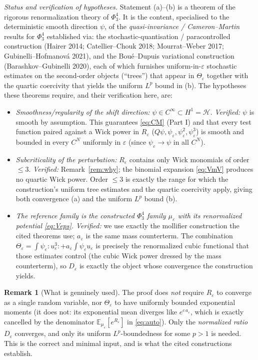 \documentclass[12pt]{article}
\newcommand{\bE}{\mathbb{E}}
\newcommand{\Wick}[1]{{:}#1{:}}
\newcommand{\eps}{\varepsilon}
\theoremstyle{plain}
\theoremstyle{definition}
\newtheorem{remark}{Remark}
\begin{document}
\noindent\emph{Status and verification of hypotheses.} Statement
(a)--(b) is a theorem of the rigorous renormalization theory of $\Phi^4_3$. It is the
content, specialised to the deterministic smooth direction $\psi$, of the
\emph{quasi-invariance / Cameron--Martin} results for $\Phi^4_3$ established via:
the stochastic-quantisation / paracontrolled construction (Hairer 2014;
Catellier--Chouk 2018; Mourrat--Weber 2017; Gubinelli--Hofmanov\'a 2021), and the
Bou\'e--Dupuis variational construction (Barashkov--Gubinelli 2020), each of which
furnishes uniform-in-$\eps$ stochastic estimates on the second-order objects
(``trees'') that appear in $\Theta_\eps$ together with the quartic coercivity that
yields the uniform $L^p$ bound in (b). The hypotheses these theorems require, and their
verification here, are:
\begin{itemize}
\item \emph{Smoothness/regularity of the shift direction:} $\psi\in C^\infty\subset
H^1=\mathcal H$. \emph{Verified:} $\psi$ is smooth by assumption. This guarantees
\eqref{eq:CM} (Part I) and that every test function paired against a Wick power in
$R_\eps$ ($Q\psi,\psi_\eps,\psi_\eps^2,\psi_\eps^3$) is smooth and bounded in every
$C^N$ uniformly in $\eps$ (since $\psi_\eps\to\psi$ in all $C^N$).
\item \emph{Subcriticality of the perturbation:} $R_\eps$ contains only Wick monomials
of order $\le3$. \emph{Verified:} Remark~\ref{rem:why}; the binomial expansion
\eqref{eq:VmV} produces no quartic Wick power. Order $\le3$ is exactly the range for
which the construction's uniform tree estimates and the quartic coercivity apply,
giving both convergence (a) and the uniform $L^p$ bound (b).
\item \emph{The reference family is the constructed $\Phi^4_3$ family $\mu_\eps$ with
its renormalized potential \eqref{eq:Veps}.} \emph{Verified:} we use exactly the
mollifier construction the cited theorems use; $a_\eps$ is the same mass counterterm.
The combination $\Theta_\eps=\int\psi_\eps\Wick{u_\eps^3}+a_\eps\int\psi_\eps u_\eps$
is precisely the renormalized cubic functional that those estimates control (the cubic
Wick power dressed by the mass counterterm), so $D_\eps$ is exactly the object whose
convergence the construction yields.
\end{itemize}

\begin{remark}[What is genuinely used]
The proof does \emph{not} require $R_\eps$ to converge as a single random variable, nor
$\Theta_\eps$ to have uniformly bounded exponential moments (it does not: its
exponential mean diverges like $e^{c\,a_\eps}$, which is exactly cancelled by the
denominator $\bE_{\mu_\eps}[e^{R_\eps}]$ in \eqref{eq:auto}). Only the
\emph{normalized ratio} $D_\eps$ converges, and only its uniform $L^p$-boundedness for
some $p>1$ is needed. This is the correct and minimal input, and is what the cited
constructions establish.
\end{remark}
\end{document}
